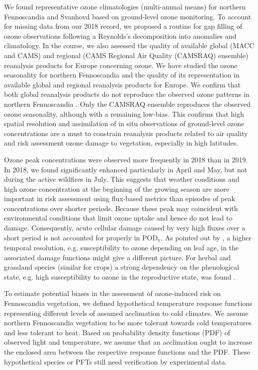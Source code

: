 \documentclass[bg, manuscript]{copernicus}
\begin{document}
We found representative ozone climatologies (multi-annual means) for northern Fennoscandia and Svanhovd based on ground-level ozone monitoring. To account for missing data from our 2018 record, we proposed a routine for gap filling of ozone observations following a Reynolds's decomposition into anomalies and climatology. In the course, we also assessed the quality of available global (MACC and CAMS) and regional (CAMS Regional Air Quality (CAMSRAQ) ensemble) reanalysis products for Europe concerning ozone. We have studied the ozone seasonality for northern Fennoscandia and the quality of its representation in available global and regional reanalysis products for Europe. We confirm that both global reanalysis products do not reproduce the observed ozone patterns in northern Fennoscandia \citep{GMD:Huijnen2020,ACPD:Barten2020}. Only the CAMSRAQ ensemble reproduces the observed ozone seasonality, although with a remaining low-bias. This confirms that high spatial resolution and assimilation of in situ observations of ground-level ozone concentrations are a must to constrain reanalysis products related to air quality and risk assessment ozone damage to vegetation, especially in high latitudes.

Ozone peak concentrations were observed more frequently in 2018 than in 2019. In 2018, we found significantly enhanced \chem{[O_3]} particularly in April and May, but not during the active wildfires in July. This suggests that weather conditions and high ozone concentration at the beginning of the growing season are more important in risk assessment using flux-based metrics than episodes of peak concentrations over shorter periods. Because these peak \chem{[O_3]} may coincident with environmental conditions that limit ozone uptake and hence do not lead to damage. Consequently, acute cellular damage caused by very high fluxes over a short period is not accounted for properly in $\mathrm{POD_y}$. As pointed out by \citet{AE:Musselman2006}, a higher temporal resolution, e.g. susceptibility to ozone depending on leaf age, in the associated damage functions might give a different picture. For herbal and grassland species (similar for crops) a strong dependency on the phenological state, e.g. high susceptibility to ozone in the reproductive state, was found \citep{EP:Bassin2004}. 

To estimate potential biases in the assessment of ozone-induced risk on Fennoscandia vegetation, we defined hypothetical temperature response functions representing different levels of assumed acclimation to cold climates. We assume northern Fennoscandia vegetation to be more tolerant towards cold temperatures and less tolerant to heat. Based on probability density functions (PDF) of observed light and temperature, we assume that an acclimation ought to increase the enclosed area between the respective response functions and the PDF. These hypothetical species or PFTs still need verification by experimental data.
\end{document}
